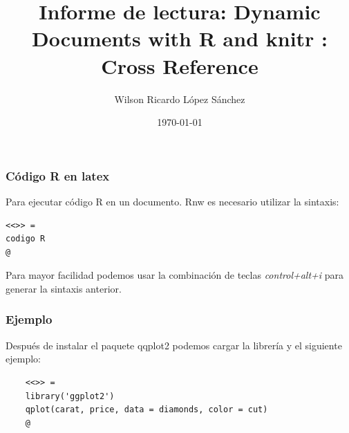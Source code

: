 \documentclass[10pt]{beamer}\usepackage[]{graphicx}\usepackage[]{color}
\begin{document}
\title[Referencias Cruzadas]{Informe de lectura: Dynamic Documents with R and knitr : Cross Reference}
		\author{Wilson Ricardo López Sánchez }
		\date{\today}


\begin{frame}
			\titlepage 
\end{frame}


		
\begin{frame}[fragile]
\frametitle{Código R en latex}
    Para ejecutar código R en un documento. Rnw es necesario utilizar la sintaxis:\\
	\begin{lstlisting}
<<>> =
codigo R
@
	\end{lstlisting}

Para mayor facilidad podemos usar la combinación de teclas \textit{control+alt+i} para generar la sintaxis anterior. \\
\end{frame}

\begin{frame}[fragile]
\frametitle{Ejemplo}
Después de instalar el paquete qqplot2 podemos cargar la librería y el siguiente ejemplo:\\
	\begin{lstlisting}
	<<>> =
	library('ggplot2')
	qplot(carat, price, data = diamonds, color = cut)
	@
	\end{lstlisting}

\end{frame}
\end{document}

